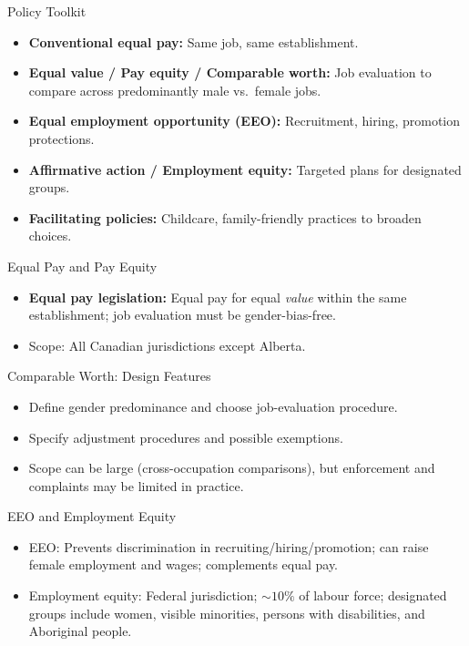 \documentclass[aspectratio=169]{beamer}
\begin{document}
\begin{frame}{Policy Toolkit}
\transfade
\begin{itemize}[<+->]
  \item \textbf{Conventional equal pay:} Same job, same establishment.
  \item \textbf{Equal value / Pay equity / Comparable worth:} Job evaluation to compare across predominantly male vs.\ female jobs.
  \item \textbf{Equal employment opportunity (EEO):} Recruitment, hiring, promotion protections.
  \item \textbf{Affirmative action / Employment equity:} Targeted plans for designated groups.
  \item \textbf{Facilitating policies:} Childcare, family-friendly practices to broaden choices.
\end{itemize}
\end{frame}

\begin{frame}{Equal Pay and Pay Equity}
\transfade
\begin{itemize}[<+->]
  \item \textbf{Equal pay legislation:} Equal pay for equal \emph{value} within the same establishment; job evaluation must be gender-bias-free.
  \item Scope: All Canadian jurisdictions except Alberta.
\end{itemize}
\end{frame}

\begin{frame}{Comparable Worth: Design Features}
\transfade
\begin{itemize}[<+->]
  \item Define gender predominance and choose job-evaluation procedure.
  \item Specify adjustment procedures and possible exemptions.
  \item Scope can be large (cross-occupation comparisons), but enforcement and complaints may be limited in practice.
\end{itemize}
\end{frame}

\begin{frame}{EEO and Employment Equity}
\transfade
\begin{itemize}[<+->]
  \item EEO: Prevents discrimination in recruiting/hiring/promotion; can raise female employment and wages; complements equal pay.
  \item Employment equity: Federal jurisdiction; \(\sim 10\%\) of labour force; designated groups include women, visible minorities, persons with disabilities, and Aboriginal people.
\end{itemize}
\end{frame}
\end{document}
